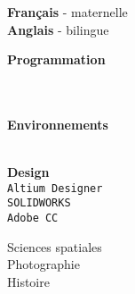 \documentclass[9pt]{developercv} %
\begin{document}
\begin{minipage}[t]{0.18\textwidth}
		\textbf{Français} - maternelle\\
		\textbf{Anglais} - bilingue

		\textbf{Programmation}
		\begin{barchart}{1.75}
		\end{barchart}
		\\\\
		\textbf{Environnements}
		\begin{barchart}{1.75}
		\end{barchart}
		\\
		\textbf{Design}\\
		\texttt{Altium Designer}\\
		\texttt{SOLIDWORKS}\\
		\texttt{Adobe CC}

		Sciences spatiales\\
		Photographie\\
		Histoire

\end{minipage}

\end{document}
